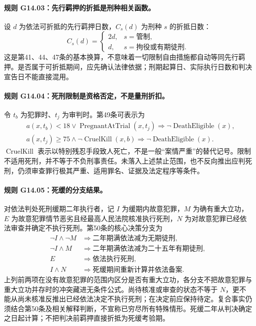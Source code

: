 \paragraph{规则 G14.03：先行羁押的折抵是刑种相关函数。}
设 $d$ 为依法可折抵的先行羁押日数，$C_s(d)$ 为刑种 $s$ 的折抵日数：
\[
C_s(d)=
\begin{cases}
2d,&s=\text{管制},\\
d,&s=\text{拘役或有期徒刑}.
\end{cases}
\]
这是第41、44、47条的基本换算，不意味着一切限制自由措施都自动等同先行羁押。是否属于可折抵期间，应先确认法律依据；刑期起算日、实际执行日数和判决宣告日不能直接混用。

\paragraph{规则 G14.04：死刑限制是资格否定，不是量刑折扣。}
令 $t_b$ 为犯罪时、$t_j$ 为审判时。第49条可表示为
\[
\begin{aligned}
&a(x,t_b)<18\lor\operatorname{PregnantAtTrial}(x,t_j)
\Longrightarrow\neg\operatorname{DeathEligible}(x),\\
&a(x,t_j)\ge75\land\neg\operatorname{CruelKill}(x,b)
\Longrightarrow\neg\operatorname{DeathEligible}(x).
\end{aligned}
\]
$\operatorname{CruelKill}$ 表示以特别残忍手段致人死亡，不是一般“案情严重”的替代记号。限制不适用死刑，并不等于不负刑事责任。未落入上述禁止范围，也不反向推出应判死刑，仍须审查罪行极其严重、适用罪名、证据及法定程序等条件。

\paragraph{规则 G14.05：死缓的分支结果。}
对依法判处死刑缓期二年执行者，记 $I$ 为缓期内故意犯罪，$M$ 为确有重大立功，$E$ 为故意犯罪情节恶劣且经最高人民法院核准执行死刑，$N$ 为对故意犯罪已经依法审查并确定不执行死刑。第50条的核心决策分支为
\[
\begin{aligned}
\neg I\land\neg M&\Longrightarrow\text{二年期满依法减为无期徒刑},\\
\neg I\land M&\Longrightarrow\text{二年期满依法减为二十五年有期徒刑},\\
E&\Longrightarrow\text{依法执行死刑},\\
I\land N&\Longrightarrow\text{死缓期间重新计算并依法备案}.
\end{aligned}
\]
上列前两项在没有故意犯罪的范围内区分是否有重大立功，各分支不把故意犯罪与重大立功并存时的冲突藏进无条件公式。尚待核准或审查的状态不等于 $N$，更不能从尚未核准反推出已经依法决定不执行死刑；在决定前应保持待定。复合事实仍须结合第50条及相关解释判断，不宣称已穷尽所有特殊情形。死缓二年从判决确定之日起计算；不把判决前羁押直接折抵为死缓考验期。

